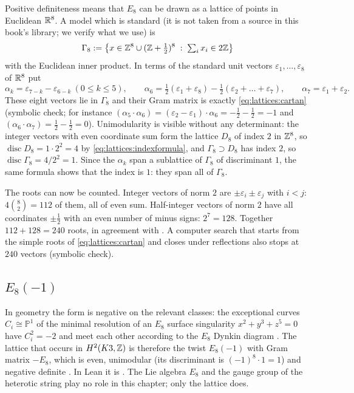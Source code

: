 \begin{example}\label{ex:lattices:D8plus}
Positive definiteness means that $E_8$ can be drawn as a lattice of points in Euclidean
$\mathbb{R}^8$. A model which is standard (it is not taken from a source in this book's library; we
verify what we use) is
\[
 \Gamma_8:=\bigl\{x\in\mathbb{Z}^8\cup(\mathbb{Z}+\tfrac12)^8\;:\;\textstyle\sum_ix_i\in2\mathbb{Z}\bigr\}
\]
with the Euclidean inner product. In terms of the standard unit vectors
$\varepsilon_1,\dots,\varepsilon_8$ of $\mathbb{R}^8$ put
\[
 \alpha_k=\varepsilon_{7-k}-\varepsilon_{6-k}\ (0\le k\le5),\qquad
 \alpha_6=\tfrac12(\varepsilon_1+\varepsilon_8)-\tfrac12(\varepsilon_2+\dots+\varepsilon_7),
 \qquad\alpha_7=\varepsilon_1+\varepsilon_2 .
\]
These eight vectors lie in $\Gamma_8$ and their Gram matrix is exactly
\eqref{eq:lattices:cartan} (symbolic check; for instance
$(\alpha_5\cdot\alpha_6)=(\varepsilon_2-\varepsilon_1)\cdot\alpha_6=-\frac12-\frac12=-1$ and
$(\alpha_6\cdot\alpha_7)=\frac12-\frac12=0$). Unimodularity is visible without any
determinant: the integer vectors with even coordinate sum form the lattice $D_8$ of index $2$
in $\mathbb{Z}^8$, so $\operatorname{disc}D_8=1\cdot2^2=4$ by \eqref{eq:lattices:indexformula}, and
$\Gamma_8\supset D_8$ has index $2$, so $\operatorname{disc}\Gamma_8=4/2^2=1$. Since the
$\alpha_k$ span a sublattice of $\Gamma_8$ of discriminant $1$, the same formula shows that
the index is $1$: they span all of $\Gamma_8$.

The roots can now be counted. Integer vectors of norm $2$ are $\pm\varepsilon_i\pm
\varepsilon_j$ with $i<j$: $4\binom82=112$ of them, all of even sum. Half-integer vectors of
norm $2$ have all coordinates $\pm\frac12$ with an even number of minus signs: $2^7=128$.
Together $112+128=240$ roots, in agreement with
. A computer search that starts from the simple
roots of \eqref{eq:lattices:cartan} and closes under reflections also stops at $240$ vectors
(symbolic check).
\end{example}

\subsection{\texorpdfstring{$E_8(-1)$}{E8(-1)}}
In geometry the form is negative on the relevant classes: the exceptional curves
$C_i\cong\mathbb P^1$ of the minimal resolution of an $E_8$ surface singularity
$x^2+y^3+z^5=0$ have $C_i^2=-2$ and meet each other according to the $E_8$ Dynkin diagram
. The lattice that occurs in $H^2(K3,\mathbb{Z})$ is
therefore the twist $E_8(-1)$ with Gram matrix $-E_8$, which is even, unimodular (its
discriminant is $(-1)^8\cdot1=1$) and negative definite . In
Lean it is . The Lie algebra $E_8$ and the gauge group of the heterotic string
play no role in this chapter; only the lattice does.

